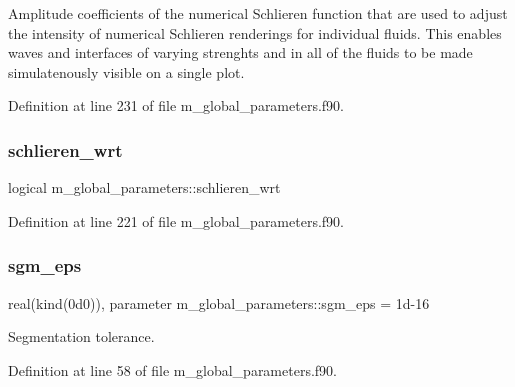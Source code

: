 Amplitude coefficients of the numerical Schlieren function that are used to adjust the intensity of numerical Schlieren renderings for individual fluids. This enables waves and interfaces of varying strenghts and in all of the fluids to be made simulatenously visible on a single plot. 



Definition at line 231 of file m\+\_\+global\+\_\+parameters.\+f90.

\mbox{\label{namespacem__global__parameters_acd86b6cea52b83b147f680d9d6da342c}} 
\subsubsection{\texorpdfstring{schlieren\+\_\+wrt}{schlieren\_wrt}}
{\footnotesize\ttfamily logical m\+\_\+global\+\_\+parameters\+::schlieren\+\_\+wrt}



Definition at line 221 of file m\+\_\+global\+\_\+parameters.\+f90.

\mbox{\label{namespacem__global__parameters_aec97838cc58623019b07ae47da7f4c1c}} 
\subsubsection{\texorpdfstring{sgm\+\_\+eps}{sgm\_eps}}
{\footnotesize\ttfamily real(kind(0d0)), parameter m\+\_\+global\+\_\+parameters\+::sgm\+\_\+eps = 1d-\/16}



Segmentation tolerance. 



Definition at line 58 of file m\+\_\+global\+\_\+parameters.\+f90.

\mbox{\label{namespacem__global__parameters_a4bd117ae744eab60f3d681fd03d6e90d}} 
